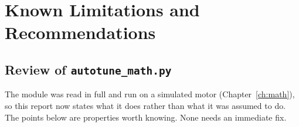 \documentclass[11pt,a4paper]{report}
\begin{document}
\chapter[Limitations]{Known Limitations and Recommendations}

\section{Review of \texttt{autotune\_math.py}}\label{sec:mathreview}
The module was read in full and run on a simulated motor (Chapter~\ref{ch:math}), so this report now states what it does rather than what it was assumed to do. The points below are properties worth knowing. None needs an immediate fix.
\end{document}
